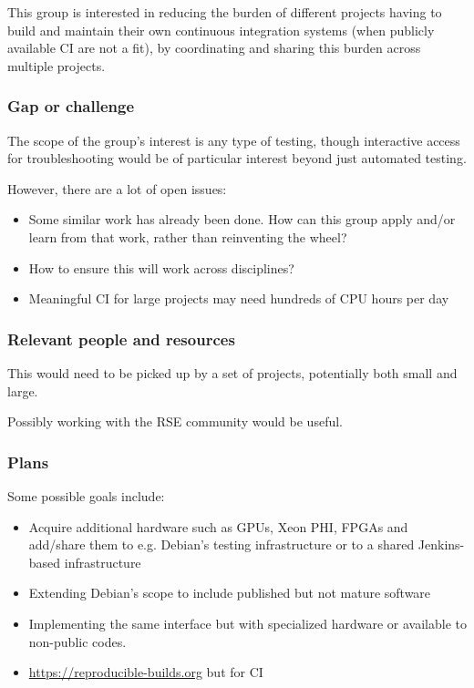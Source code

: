 This group is interested in reducing the burden of different projects having to build and maintain their own continuous integration systems (when publicly available CI are not a fit), by coordinating and sharing this burden across multiple projects.

\subsubsection{Gap or challenge}

The scope of the group's interest is any type of testing, though interactive access for troubleshooting would be of particular interest beyond just automated testing.

However, there are a lot of open issues:

\begin{itemize}
\item Some similar work has already been done.  How can this group apply and/or learn from that work, rather than reinventing the wheel?
\item How to ensure this will work across disciplines?
\item Meaningful CI for large projects may need hundreds of CPU hours per day
\end{itemize}


\subsubsection{Relevant people and resources}

This would need to be picked up by a set of projects, potentially both small and large.

Possibly working with the RSE community would be useful.

\subsubsection{Plans}

Some possible goals include:
\begin{itemize}
\item Acquire additional hardware such as GPUs, Xeon PHI, FPGAs and add/share them to e.g. Debian's testing infrastructure or to a shared Jenkins-based infrastructure
\item Extending Debian's scope to include published but not mature software
\item Implementing the same interface but with specialized hardware or available to non-public codes.
\item \url{https://reproducible-builds.org} but for CI 
\end{itemize}

